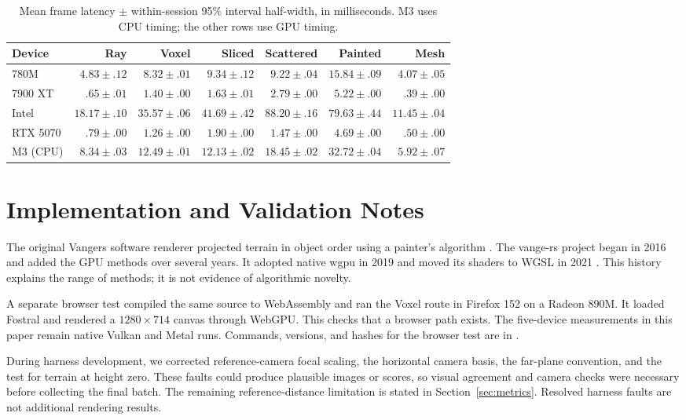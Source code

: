 \documentclass{jcgt}
\begin{document}
\begin{table}[htbp]\centering\small
\caption{Mean frame latency $\pm$ within-session 95\% interval half-width, in milliseconds. M3 uses CPU timing; the other rows use GPU timing.}\label{tab:intervals}
\setlength{\tabcolsep}{2.5pt}
\begin{tabular}{@{}lrrrrrr@{}}
\toprule
Device & Ray & Voxel & Sliced & Scattered & Painted & Mesh \\
\midrule
780M & $4.83\pm.12$ & $8.32\pm.01$ & $9.34\pm.12$ & $9.22\pm.04$ & $15.84\pm.09$ & $4.07\pm.05$ \\
7900 XT & $.65\pm.01$ & $1.40\pm.00$ & $1.63\pm.01$ & $2.79\pm.00$ & $5.22\pm.00$ & $.39\pm.00$ \\
Intel & $18.17\pm.10$ & $35.57\pm.06$ & $41.69\pm.42$ & $88.20\pm.16$ & $79.63\pm.44$ & $11.45\pm.04$ \\
RTX 5070 & $.79\pm.00$ & $1.26\pm.00$ & $1.90\pm.00$ & $1.47\pm.00$ & $4.69\pm.00$ & $.50\pm.00$ \\
\midrule
M3 (CPU) & $8.34\pm.03$ & $12.49\pm.01$ & $12.13\pm.02$ & $18.45\pm.02$ & $32.72\pm.04$ & $5.92\pm.07$ \\
\bottomrule
\end{tabular}
\end{table}

\section{Implementation and Validation Notes}\label{sec:implementation}

The original Vangers software renderer projected terrain in object order using a painter's algorithm \citep{vangerssource}. The vange-rs project began in 2016 and added the GPU methods over several years. It adopted native wgpu in 2019 and moved its shaders to WGSL in 2021 \citep{malyshau2020webgpu,malyshau2021rust}. This history explains the range of methods; it is not evidence of algorithmic novelty.

A separate browser test compiled the same source to WebAssembly and ran the Voxel route in Firefox 152 on a Radeon 890M. It loaded Fostral and rendered a $1280\times714$ canvas through WebGPU. This checks that a browser path exists. The five-device measurements in this paper remain native Vulkan and Metal runs. Commands, versions, and hashes for the browser test are in .

During harness development, we corrected reference-camera focal scaling, the horizontal camera basis, the far-plane convention, and the test for terrain at height zero. These faults could produce plausible images or scores, so visual agreement and camera checks were necessary before collecting the final batch. The remaining reference-distance limitation is stated in Section~\ref{sec:metrics}. Resolved harness faults are not additional rendering results.
\end{document}
